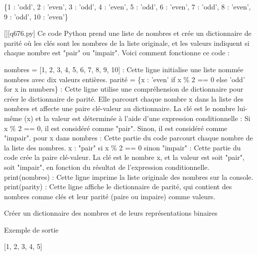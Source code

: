 \{1 : 'odd', 2 : 'even', 3 : 'odd', 4 : 'even', 5 : 'odd', 6 : 'even', 7 : 'odd', 8 : 'even', 9 : 'odd', 10 : 'even'\}
        \par
        \begin{solution}
            \renewcommand{\nomfichier}{q676.py}
            \pythonfile{\chemincode \nomfichier}[][\nomfichier]
            Ce code Python prend une liste de nombres et crée un dictionnaire de parité où les clés sont les nombres de la liste originale, et les valeurs indiquent si chaque nombre est "pair" ou "impair". Voici comment fonctionne ce code :

    nombres = [1, 2, 3, 4, 5, 6, 7, 8, 9, 10] : Cette ligne initialise une liste nommée nombres avec dix valeurs entières.
    parité = \{x : 'even' if x \% 2 == 0 else 'odd' for x in numbers\} : Cette ligne utilise une compréhension de dictionnaire pour créer le dictionnaire de parité. Elle parcourt chaque nombre x dans la liste des nombres et affecte une paire clé-valeur au dictionnaire. La clé est le nombre lui-même (x) et la valeur est déterminée à l'aide d'une expression conditionnelle :
        Si x \% 2 == 0, il est considéré comme "pair". Sinon, il est considéré comme "impair".
        pour x dans nombres : Cette partie du code parcourt chaque nombre de la liste des nombres.
        x : "pair" si x \% 2 == 0 sinon "impair" : Cette partie du code crée la paire clé-valeur. La clé est le nombre x, et la valeur est soit "pair", soit "impair", en fonction du résultat de l'expression conditionnelle.
    print(nombres) : Cette ligne imprime la liste originale des nombres sur la console.
    print(parity) : Cette ligne affiche le dictionnaire de parité, qui contient des nombres comme clés et leur parité (paire ou impaire) comme valeurs.
        \end{solution}
        

        \question
        Créer un dictionnaire des nombres et de leurs représentations binaires

Exemple de sortie

[1, 2, 3, 4, 5]

